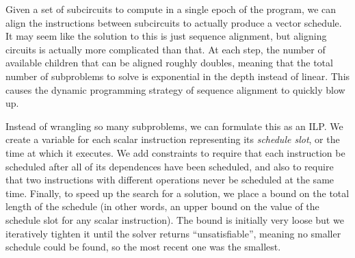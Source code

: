 Given a set of subcircuits to compute in a single epoch of the program, we can align the instructions between subcircuits to actually produce a vector schedule.
It may seem like the solution to this is just sequence alignment, but aligning circuits is actually more complicated than that.
At each step, the number of available children that can be aligned roughly doubles, meaning that the total number of subproblems to solve is exponential in the depth instead of linear. 
This causes the dynamic programming strategy of sequence alignment to quickly blow up.

Instead of wrangling so many subproblems, we can formulate this as an ILP.
We create a variable for each scalar instruction representing its {\em schedule slot}, or the time at which it executes.
We add constraints to require that each instruction be scheduled after all of its dependences have been scheduled, and also to require that two instructions with different operations never be scheduled at the same time. 
Finally, to speed up the search for a solution, we place a bound on the total length of the schedule (in other words, an upper bound on the value of the schedule slot for any scalar instruction).
The bound is initially very loose but we iteratively tighten it until the solver returns ``unsatisfiable'', meaning no smaller schedule could be found, so the most recent one was the smallest.

